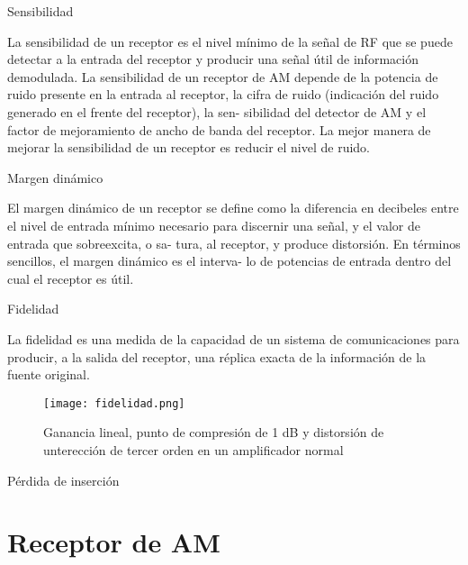 \begin{frame}{Sensibilidad}
\protect\hypertarget{sensibilidad}{}

La sensibilidad de un receptor es el nivel mínimo de la señal de RF que
se puede detectar a la entrada del receptor y producir una señal útil de
información demodulada. La sensibilidad de un receptor de AM depende de
la potencia de ruido presente en la entrada al receptor, la cifra de
ruido (indicación del ruido generado en el frente del receptor), la sen-
sibilidad del detector de AM y el factor de mejoramiento de ancho de
banda del receptor. La mejor manera de mejorar la sensibilidad de un
receptor es reducir el nivel de ruido.

\end{frame}

\begin{frame}{Margen dinámico}
\protect\hypertarget{margen-dinuxe1mico}{}

El margen dinámico de un receptor se define como la diferencia en
decibeles entre el nivel de entrada mínimo necesario para discernir una
señal, y el valor de entrada que sobreexcita, o sa- tura, al receptor, y
produce distorsión. En términos sencillos, el margen dinámico es el
interva- lo de potencias de entrada dentro del cual el receptor es útil.

\end{frame}

\begin{frame}{Fidelidad}
\protect\hypertarget{fidelidad}{}

La fidelidad es una medida de la capacidad de un sistema de
comunicaciones para producir, a la salida del receptor, una réplica
exacta de la información de la fuente original.

\begin{figure}
\centering
\texttt{[image: fidelidad.png]}
\caption{Ganancia lineal, punto de compresión de 1 dB y distorsión de
unterección de tercer orden en un amplificador normal}
\end{figure}

\end{frame}

\begin{frame}{Pérdida de inserción}
\protect\hypertarget{puxe9rdida-de-inserciuxf3n}{}

\end{frame}

\hypertarget{receptor-de-am}{%
\section{Receptor de AM}\label{receptor-de-am}}

